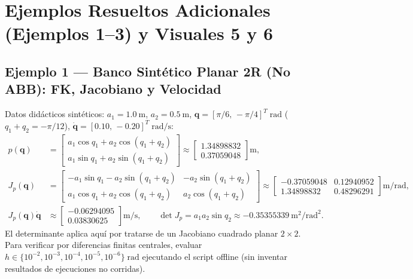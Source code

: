 \documentclass[10pt, a4paper]{article}
\begin{document}
\section{Ejemplos Resueltos Adicionales (Ejemplos 1–3) y Visuales 5 y 6}

\subsection{Ejemplo 1 — Banco Sintético Planar 2R (No ABB): FK, Jacobiano y Velocidad}
Datos didácticos sintéticos: $a_1 = \SI{1.0}{\meter}$, $a_2 = \SI{0.5}{\meter}$, $\mathbf{q} = [\pi/6,\, -\pi/4]^T\;\mathrm{rad}$ ($q_1 + q_2 = -\pi/12$), $\dot{\mathbf{q}} = [0.10,\, -0.20]^T\;\mathrm{rad/s}$:
\begin{align}
    p(\mathbf{q}) &= \begin{bmatrix} a_1\cos q_1 + a_2\cos(q_1+q_2) \\ a_1\sin q_1 + a_2\sin(q_1+q_2) \end{bmatrix} \approx \begin{bmatrix} 1.34898832 \\ 0.37059048 \end{bmatrix}\mathrm{m}, \label{eq:ex1_fk}\\
    J_p(\mathbf{q}) &= \begin{bmatrix} -a_1\sin q_1 - a_2\sin(q_1+q_2) & -a_2\sin(q_1+q_2) \\ a_1\cos q_1 + a_2\cos(q_1+q_2) & a_2\cos(q_1+q_2) \end{bmatrix} \approx \begin{bmatrix} -0.37059048 & 0.12940952 \\ 1.34898832 & 0.48296291 \end{bmatrix}\mathrm{m/rad}, \label{eq:ex1_j}\\
    J_p(\mathbf{q})\dot{\mathbf{q}} &\approx \begin{bmatrix} -0.06294095 \\ 0.03830625 \end{bmatrix}\mathrm{m/s}, \qquad
    \det J_p = a_1 a_2 \sin q_2 \approx \SI{-0.35355339}{\meter\squared\per\radian\squared}. \label{eq:ex1_v}
\end{align}
El determinante aplica aquí por tratarse de un Jacobiano cuadrado planar $2\times 2$. Para verificar por diferencias finitas centrales, evaluar $h \in \{10^{-2}, 10^{-3}, 10^{-4}, 10^{-5}, 10^{-6}\}\;\mathrm{rad}$ ejecutando el script offline (sin inventar resultados de ejecuciones no corridas).
\end{document}
